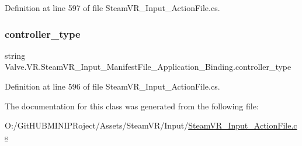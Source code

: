 Definition at line 597 of file Steam\+V\+R\+\_\+\+Input\+\_\+\+Action\+File.\+cs.

\mbox{\label{class_valve_1_1_v_r_1_1_steam_v_r___input___manifest_file___application___binding_a7639ba36a1c79e202456d91f6fb6e621}} 
\subsubsection{\texorpdfstring{controller\_type}{controller\_type}}
{\footnotesize\ttfamily string Valve.\+V\+R.\+Steam\+V\+R\+\_\+\+Input\+\_\+\+Manifest\+File\+\_\+\+Application\+\_\+\+Binding.\+controller\+\_\+type}



Definition at line 596 of file Steam\+V\+R\+\_\+\+Input\+\_\+\+Action\+File.\+cs.



The documentation for this class was generated from the following file\+:\begin{DoxyCompactItemize}
\item 
O\+:/\+Git\+H\+U\+B\+M\+I\+N\+I\+P\+Roject/\+Assets/\+Steam\+V\+R/\+Input/\mbox{\hyperlink{_steam_v_r___input___action_file_8cs}{Steam\+V\+R\+\_\+\+Input\+\_\+\+Action\+File.\+cs}}\end{DoxyCompactItemize}
